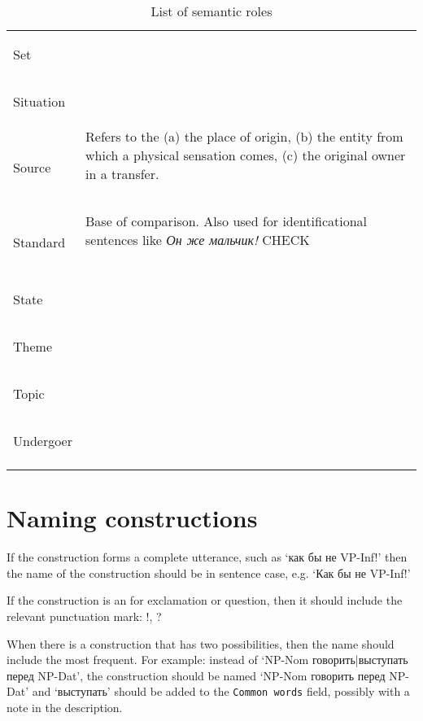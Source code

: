 \documentclass[a4paper,11pt, onecolumn,twoside]{article}
\begin{document}
\begin{longtable}{ p{}  p{} }
\midrule
 \multirow{2}{*}{Set} & ~ \\ 
        & ~ \\
\midrule
 \multirow{2}{*}{Situation} & ~ \\ 
        & ~ \\
\midrule
 \multirow{2}{*}{Source} & Refers to the (a) the place of origin, (b) the entity from which a physical sensation comes, (c) the original owner in a transfer. \\ 
        & ~ \\
\midrule
 \multirow{2}{*}{Standard} & Base of comparison. Also used for identificational sentences like \emph{Он же мальчик!} CHECK \\ %
        & ~ \\
\midrule
 \multirow{2}{*}{State} & ~ \\ 
        & ~ \\
\midrule
 \multirow{2}{*}{Theme} & ~ \\ 
        & ~ \\
\midrule
 \multirow{2}{*}{Topic} & ~ \\  %
        & ~ \\
\midrule
 \multirow{2}{*}{Undergoer} & ~ \\ %
        & ~ \\
\bottomrule
\caption{List of semantic roles}
\label{table:semroles}
\end{longtable}

\section{Naming constructions}
\label{sec:name}


If the construction forms a complete utterance, such as `как бы не VP-Inf!' then the 
name of the construction should be in sentence case, e.g. `Как бы не VP-Inf!'

If the construction is an for exclamation or question, then it should include the 
relevant punctuation mark: !, ?

When there is a construction that has two possibilities, then the name should 
include the most frequent. For example: instead of `NP-Nom говорить|выступать перед NP-Dat',
the construction should be named `NP-Nom говорить перед NP-Dat' and `выступать' should
be added to the \texttt{Common words} field, possibly with a note in the description.
\end{document}
